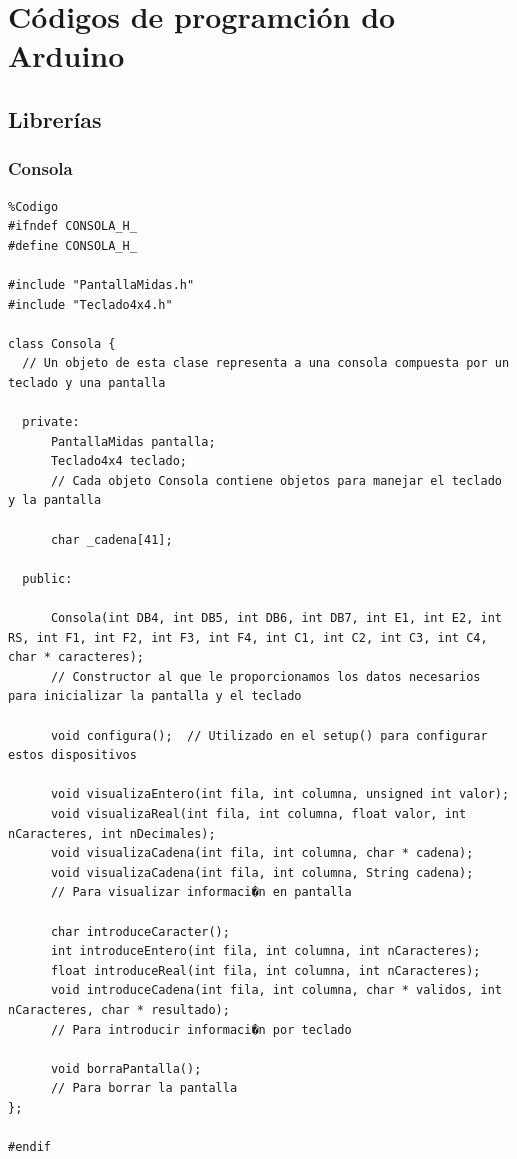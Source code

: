 \documentclass[11pt,twoside]{book}
\begin{document}
{\hypersetup{hidelinks}}

\cleardoublepage
\chapter{Códigos de programción do Arduino}
\section{Librerías}

\subsection{Consola}
\begin{lstlisting}
%Codigo
#ifndef CONSOLA_H_
#define CONSOLA_H_

#include "PantallaMidas.h"
#include "Teclado4x4.h"

class Consola {
  // Un objeto de esta clase representa a una consola compuesta por un teclado y una pantalla
  
  private:
      PantallaMidas pantalla;
      Teclado4x4 teclado;
      // Cada objeto Consola contiene objetos para manejar el teclado y la pantalla
      
      char _cadena[41];
      
  public: 
  
      Consola(int DB4, int DB5, int DB6, int DB7, int E1, int E2, int RS, int F1, int F2, int F3, int F4, int C1, int C2, int C3, int C4, char * caracteres);
      // Constructor al que le proporcionamos los datos necesarios para inicializar la pantalla y el teclado
      
      void configura();  // Utilizado en el setup() para configurar estos dispositivos
      
      void visualizaEntero(int fila, int columna, unsigned int valor);
      void visualizaReal(int fila, int columna, float valor, int nCaracteres, int nDecimales);
      void visualizaCadena(int fila, int columna, char * cadena);  
      void visualizaCadena(int fila, int columna, String cadena);
      // Para visualizar informaci�n en pantalla
      
      char introduceCaracter();
      int introduceEntero(int fila, int columna, int nCaracteres);
      float introduceReal(int fila, int columna, int nCaracteres);
      void introduceCadena(int fila, int columna, char * validos, int nCaracteres, char * resultado);
      // Para introducir informaci�n por teclado
      
      void borraPantalla();
      // Para borrar la pantalla
};

#endif

\end{lstlisting}
\end{document}
